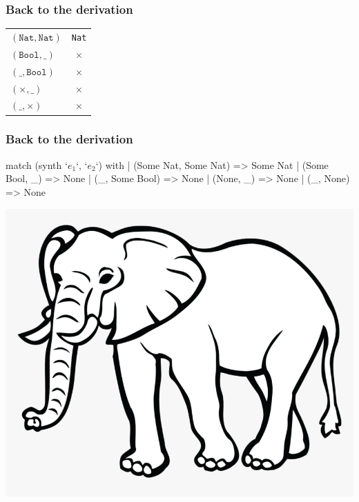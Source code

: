 \documentclass[usenames,dvipsnames]{beamer}
\newcommand{\Nat}{\texttt{Nat}}
\newcommand{\Bool}{\texttt{Bool}}
\newcommand{\notype}{\times}
\begin{document}

{
  \begin{frame}
    \frametitle{Back to the derivation}

    \begin{center}
      \begin{tabular}{l|c}
        $(\Nat, \Nat)$ & \Nat \\
        $(\Bool, \_)$ & $\notype$ \\
        $(\_, \Bool)$ & $\notype$ \\
        $(\notype, \_)$ & $\notype$ \\
        $(\_, \notype)$ & $\notype$
      \end{tabular}
    \end{center}
  \end{frame}
}


{
  \begin{frame}[fragile]
    \frametitle{Back to the derivation}

    \begin{code}
      match (synth `$e_1$`, `$e_2$`) with
      | (Some Nat, Some Nat) => Some Nat
      | (Some Bool, _) => None
      | (_, Some Bool) => None
      | (None, _) => None
      | (_, None) => None
    \end{code}
  \end{frame}
}


\begin{frame}
  \begin{center}
    \includegraphics[scale=0.3]{elephant}
  \end{center}
\end{frame}
\end{document}
